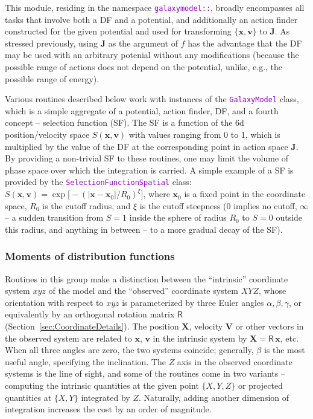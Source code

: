 \documentclass[12pt]{article}
\newcommand{\ttt}[1]{\textcolor{darkviolet}{\texttt{#1}}}
\newcommand{\bv}{\boldsymbol{v}}
\newcommand{\bx}{\boldsymbol{x}}
\newcommand{\bX}{\boldsymbol{X}}
\newcommand{\bV}{\boldsymbol{V}}
\newcommand{\bJ}{\boldsymbol{J}}
\begin{document}
This module, residing in the namespace \ttt{galaxymodel::}, broadly encompasses all tasks that involve both a DF and a potential, and additionally an action finder constructed for the given potential and used for transforming $\{\bx,\bv\}$ to $\bJ$.
As stressed previously, using $\bJ$ as the argument of $f$ has the advantage that the DF may be used with an arbitrary potenial without any modifications (because the possible range of actions does not depend on the potential, unlike, e.g., the possible range of energy).

Various routines described below work with instances of the \ttt{GalaxyModel} class, which is a simple aggregate of a potential, action finder, DF, and a fourth concept -- selection function (SF). The SF is a function of the 6d position/velocity space $S(\bx,\bv)$ with values ranging from 0 to 1, which is multiplied by the value of the DF at the corresponding point in action space $\bJ$. By providing a non-trivial SF to these routines, one may limit the volume of phase space over which the integration is carried. A simple example of a SF is provided by the \ttt{SelectionFunctionSpatial} class: $S(\bx, \bv) = \exp\big[-(|\bx-\bx_0|/R_0)^\xi\big]$, where $\bx_0$ is a fixed point in the coordinate space, $R_0$ is the cutoff radius, and $\xi$ is the cutoff steepness (0 implies no cutoff, $\infty$ -- a sudden transition from $S=1$ inside the sphere of radius $R_0$ to $S=0$ outside this radius, and anything in between -- to a more gradual decay of the SF).

\subsubsection{Moments of distribution functions}  \label{sec:Moments}

Routines in this group make a distinction between the ``intrinsic'' coordinate system $xyz$ of the model and the ``observed'' coordinate system $XYZ$, whose orientation with respect to $xyz$ is parameterized by three Euler angles $\alpha,\beta,\gamma$, or equivalently by an orthogonal rotation matrix $\mathsf R$ (Section~\ref{sec:CoordinateDetails}). The position $\bX$, velocity $\bV$ or other vectors in the observed system are related to $\bx,\,\bv$ in the intrinsic system by $\bX = \mathsf R\,\bx$, etc. When all three angles are zero, the two systems coincide; generally, $\beta$ is the most useful angle, specifying the inclination. The $Z$ axis in the observed coordinate systems is the line of sight, and some of the routines come in two variants -- computing the intrinsic quantities at the given point $\{X,Y,Z\}$ or projected quantities at $\{X,Y\}$ integrated by $Z$. Naturally, adding another dimension of integration increases the cost by an order of magnitude.
\end{document}
